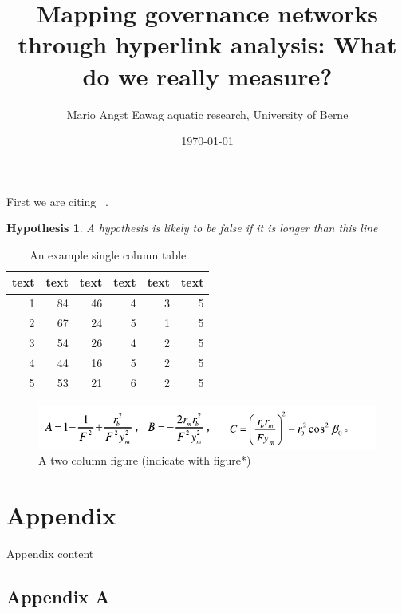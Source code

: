 \documentclass[11pt, twocolumn]{article}
\title{\Huge Mapping governance networks through hyperlink analysis: What do we really measure?  \vspace{0.5cm}}
\author{\Large Mario Angst \normalsize \hspace{0.5cm} Eawag aquatic research, University of Berne}
\date{\today}
\makeatletter
\renewcommand{\maketitle}{\bgroup\setlength{\parindent}{0pt}
\begin{flushleft}
  \textbf{\@title}

  \@author
\end{flushleft}\egroup
}
\renewcommand{\abstractname}{}    %
\renewenvironment{abstract}
 {\small
  \begin{center}
  \bfseries \abstractname\vspace{-.5em}\vspace{0pt}
  \end{center}
  \list{}{%
    \setlength{\leftmargin}{10mm}%
    \setlength{\rightmargin}{\leftmargin}%
  }%
  \item\relax}
 {\endlist}
\newtheorem{Hyp}{Hypothesis}
\makeatother
\begin{document}
\twocolumn[
\begin{@twocolumnfalse}
\maketitle
\begin{abstract}
\textit{\lipsum[1]
\bigskip}
\end{abstract}
\end{@twocolumnfalse}
]

First we are citing ~\parencite{Alpher02}.

\lipsum[1]

\begin{Hyp}
A hypothesis is likely to be false if it is longer than this line
\label{hyp:nd_conflictivity}
\end{Hyp}

\lipsum[1]

\begin{table}[ht]
\centering
\begin{tabular}{rrrrrr}
  \toprule[1.5pt]
  text & text & text & text & text & text  \\
  \midrule[0.8pt]
  1 &  84 &  46 &   4 &   3 &   5 \\
    2 &  67 &  24 &   5 &   1 &   5 \\
    3 &  54 &  26 &   4 &   2 &   5 \\
    4 &  44 &  16 &   5 &   2 &   5 \\
    5 &  53 &  21 &   6 &   2 &   5 \\
   \bottomrule[1.5pt]
\end{tabular}
\caption{An example single column table}
\label{tab:example}
\end{table}

\lipsum[1]

\begin{figure}[ht!]
\centering
\includegraphics[width=1\textwidth]{picture/equation.png}
\caption{A two column figure (indicate with figure*)}
\label{fig:example}
\end{figure}

\lipsum[1]

\printbibliography

\clearpage
\appendix
\renewcommand\thefigure{A\arabic{figure}}
\setcounter{figure}{0}

\section*{Appendix}

Appendix content

\subsection*{Appendix A}
\lipsum[2]
\end{document}
